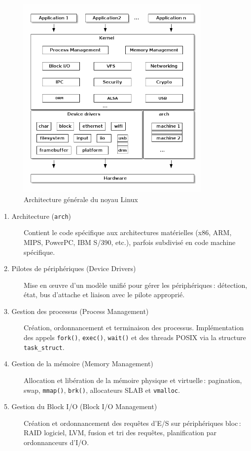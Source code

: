 \begin{figure}[H]
  \centering
  \includegraphics[width=0.85\textwidth]{images_pfe/kernelarchitecture.png}
  \caption{Architecture générale du noyau Linux}
  \label{fig:kernel-arch}
\end{figure}

\begin{description}
  \item[1. Architecture (\texttt{arch})]  
    Contient le code spécifique aux architectures matérielles (x86, ARM, MIPS, PowerPC, IBM S/390, etc.), parfois subdivisé en code machine spécifique.
  \item[2. Pilotes de périphériques (Device Drivers)]  
    Mise en œuvre d’un modèle unifié pour gérer les périphériques : détection, état, bus d’attache et liaison avec le pilote approprié.
  \item[3. Gestion des processus (Process Management)]  
    Création, ordonnancement et terminaison des processus. Implémentation des appels \texttt{fork()}, \texttt{exec()}, \texttt{wait()} et des threads POSIX via la structure \texttt{task\_struct}.
  \item[4. Gestion de la mémoire (Memory Management)]  
    Allocation et libération de la mémoire physique et virtuelle : pagination, swap, \texttt{mmap()}, \texttt{brk()}, allocateurs SLAB et \texttt{vmalloc}.
  \item[5. Gestion du Block I/O (Block I/O Management)]  
    Création et ordonnancement des requêtes d’E/S sur périphériques bloc : RAID logiciel, LVM, fusion et tri des requêtes, planification par ordonnanceurs d’I/O.
\end{description}

